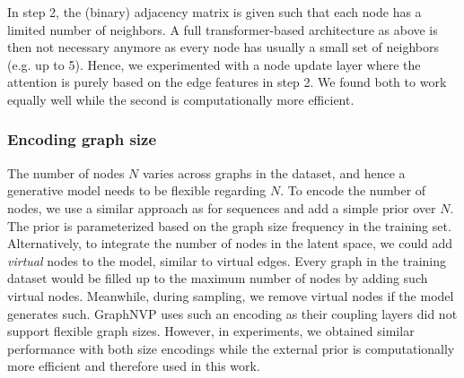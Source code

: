 In step 2, the (binary) adjacency matrix is given such that each node has a limited number of neighbors. 
A full transformer-based architecture as above is then not necessary anymore as every node has usually a small set of neighbors (e.g. up to 5). 
Hence, we experimented with a node update layer where the attention is purely based on the edge features in step 2. 
We found both to work equally well while the second is computationally more efficient.

\subsubsection{Encoding graph size}
The number of nodes $N$ varies across graphs in the dataset, and hence a generative model needs to be flexible regarding $N$. 
To encode the number of nodes, we use a similar approach as \citet{SemiDiscreteNFSequence} for sequences and add a simple prior over $N$. 
The prior is parameterized based on the graph size frequency in the training set.
Alternatively, to integrate the number of nodes in the latent space, we could add \textit{virtual} nodes to the model, similar to virtual edges. 
Every graph in the training dataset would be filled up to the maximum number of nodes by adding such virtual nodes. 
Meanwhile, during sampling, we remove virtual nodes if the model generates such. 
GraphNVP \cite{GraphNVP} uses such an encoding as their coupling layers did not support flexible graph sizes. 
However, in experiments, we obtained similar performance with both size encodings while the external prior is computationally more efficient and therefore used in this work.